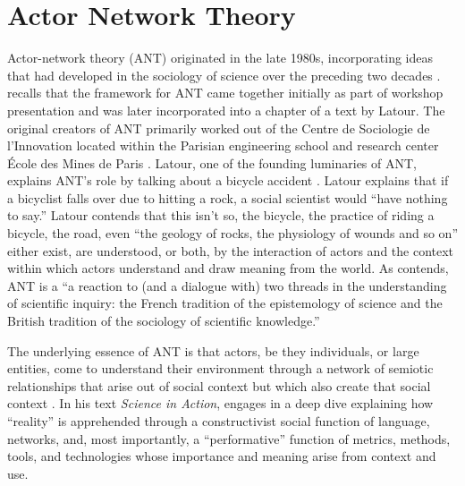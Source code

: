 \section{Actor Network Theory}

Actor-network theory (ANT) originated in the late 1980s, incorporating ideas that had developed in the sociology of science over the preceding two decades \parencite{muniesaActorNetworkTheory2015}. \textcite{bijkerSocialConstructionTechnological2012} recalls that the framework for ANT came together initially as part of workshop presentation and was later incorporated into a chapter of a text by Latour. The original creators of ANT primarily worked out of the Centre de Sociologie de l’Innovation located within the Parisian engineering school and research center École des Mines de Paris \parencite{lawActorNetworkTheory2008}. Latour, one of the founding luminaries of ANT, explains ANT's role by talking about a bicycle accident \citeyear{latourWhenThingsStrike2000}. Latour explains that if a bicyclist falls over due to hitting a rock, a social scientist would ``have nothing to say.'' Latour contends that this isn't so, the bicycle, the practice of riding a bicycle, the road, even ``the geology of rocks, the physiology of wounds and so on'' either exist, are understood, or both, by the interaction of actors and the context within which actors understand and draw meaning from the world. As \textcite{muniesaActorNetworkTheory2015} contends, ANT is a ``a reaction to (and a dialogue with) two threads in the understanding of scientific inquiry: the French tradition of the epistemology of science and the British tradition of the sociology of scientific knowledge.''

The underlying essence of ANT is that actors, be they individuals, or large entities, come to understand their environment through a network of semiotic relationships that arise out of social context but which also create that social context \parencite{latourReassemblingSocialIntroduction2005}. In his text \textit{Science in Action}, \textcite{latourScienceActionHow1987} engages in a deep dive explaining how ``reality'' is apprehended through a constructivist social function of language, networks, and, most importantly, a ``performative'' function of metrics, methods, tools, and technologies whose importance and meaning arise from context and use.

